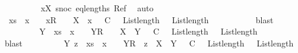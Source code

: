 \ \ \ \ \ \ \ \ \isamarkupfalse%
\ xX{}\ snoc\ eq{\isacharunderscore}lengths\ Ref\ \isamarkupfalse%
\ auto\isanewline
\ \ \ \ \ \ \isamarkupfalse%
\ \isamarkupfalse%
\ {\isachardoublequoteopen}{\isasymexists}{\isasymrho}\ xs\ {\isacharat}\ {\isacharbrackleft}x{\isacharbrackright}\ {\isacharequal}\ {\isasymrho}\ {\isacharat}\ {\isacharbrackleft}{\isacharbrackleft}x{}{\isacharbrackright}\isactrlsub R{\isacharbrackright}\ {\isacharat}\ {\isacharbrackleft}{\isacharbrackright}\ {\isasymand}\ X\ {\isasymsubseteq}\ x{}\ {\isasymand}\ {\isasymrho}\ {\isasymlesssim}\isactrlsub C\ {\isasymrho}\ {\isasymand}\ List{\isachardot}length\ {\isacharparenleft}{\isasymrho}\ {\isacharequal}\ List{\isachardot}length\ {\isacharparenleft}{\isasymrho}{\isacharparenright}{\isachardoublequoteclose}\isanewline
\ \ \ \ \ \ \ \ \isamarkupfalse%
\ blast\isanewline
\ \ \ \ \ \ \isamarkupfalse%
\ \isamarkupfalse%
\ {\isachardoublequoteopen}{\isasymexists}Y\ {\isasymrho}\ xs\ {\isacharat}\ {\isacharbrackleft}x{\isacharbrackright}\ {\isacharequal}\ {\isasymrho}\ {\isacharat}\ {\isacharbrackleft}{\isacharbrackleft}Y{\isacharbrackright}\isactrlsub R{\isacharbrackright}\ {\isacharat}\ {\isacharbrackleft}{\isacharbrackright}\ {\isasymand}\ X\ {\isasymsubseteq}\ Y\ {\isasymand}\ {\isasymrho}\ {\isasymlesssim}\isactrlsub C\ {\isasymrho}\ {\isasymand}\ List{\isachardot}length\ {\isacharparenleft}{\isasymrho}\ {\isacharequal}\ List{\isachardot}length\ {\isacharparenleft}{\isasymrho}{\isacharparenright}{\isachardoublequoteclose}\isanewline
\ \ \ \ \ \ \ \ \isamarkupfalse%
\ blast\isanewline
\ \ \ \ \ \ \isamarkupfalse%
\ \isamarkupfalse%
\ {\isachardoublequoteopen}{\isasymexists}Y\ z\ {\isasymrho}\ xs\ {\isacharat}\ {\isacharbrackleft}x{\isacharbrackright}\ {\isacharequal}\ {\isasymrho}\ {\isacharat}\ {\isacharbrackleft}{\isacharbrackleft}Y{\isacharbrackright}\isactrlsub R{\isacharbrackright}\ {\isacharat}\ z\ {\isasymand}\ X\ {\isasymsubseteq}\ Y\ {\isasymand}\ {\isasymrho}\ {\isasymlesssim}\isactrlsub C\ {\isasymrho}\ {\isasymand}\ List{\isachardot}length\ {\isacharparenleft}{\isasymrho}\ {\isacharequal}\ List{\isachardot}length\ {\isacharparenleft}{\isasymrho}{\isacharparenright}{\isachardoublequoteclose}\isanewline
